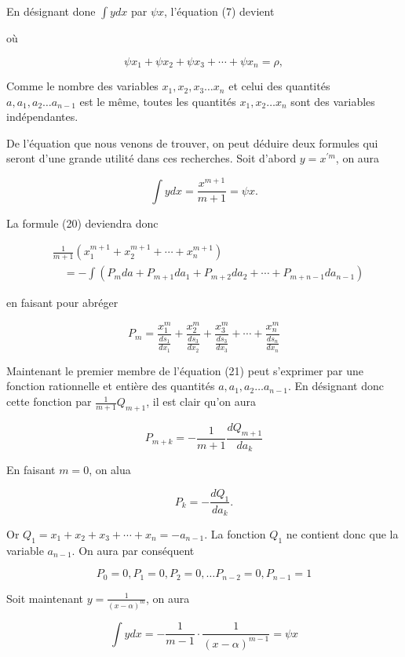 \documentclass{article}
\begin{document}
En désignant done \(\int y d x\) par \(\psi x\), l'équation (7) devient

où

\[
\psi x_{1}+\psi x_{2}+\psi x_{3}+\cdots+\psi x_{n}=\rho,
\]


Comme le nombre des variables \(x_{1}, x_{2}, x_{3} \ldots x_{n}\) et celui des quantités \(a, a_{1}, a_{2} \ldots a_{n-1}\) est le même, toutes les quantités \(x_{1}, x_{2} \ldots x_{n}\) sont des variables indépendantes.

De l'équation que nous venons de trouver, on peut déduire deux formules qui seront d'une grande utilité dans ces recherches. Soit d'abord \(y=x^{\prime m}\), on aura

\[
\int y d x=\frac{x^{m+1}}{m+1}=\psi x .
\]

La formule (20) deviendra donc

\[
\begin{aligned}
& \frac{1}{m+1}\left(x_{1}^{m+1}+x_{2}^{m+1}+\cdots+x_{n}^{m+1}\right) \\
& \quad=-\int\left(P_{m} d a+P_{m+1} d a_{1}+P_{m+2} d a_{2}+\cdots+P_{m+n-1} d a_{n-1}\right)
\end{aligned}
\]

en faisant pour abréger

\[
P_{m}=\frac{x_{1}^{m}}{\frac{d s_{1}}{d x_{1}}}+\frac{x_{2}^{m}}{\frac{d s_{3}}{d x_{2}}}+\frac{x_{3}^{m}}{\frac{d s_{3}}{d x_{3}}}+\cdots+\frac{x_{n}^{m}}{\frac{d s_{n}}{d x_{n}}}
\]

Maintenant le premier membre de l'équation (21) peut s'exprimer par une fonction rationnelle et entière des quantités \(a, a_{1}, a_{2} \ldots a_{n-1}\). En désignant donc cette fonction par \(\frac{1}{m+1} Q_{m+1}\), il est clair qu'on aura

\[
P_{m+k}=-\frac{1}{m+1} \frac{d Q_{m+1}}{d a_{k}}
\]

En faisant \(m=0\), on alua

\[
P_{k}=-\frac{d Q_{1}}{d a_{k}} .
\]

Or \(Q_{1}=x_{1}+x_{2}+x_{3}+\cdots+x_{n}=-a_{n-1}\). La fonction \(Q_{1}\) ne contient donc que la variable \(a_{n-1}\). On aura par conséquent

\[
P_{0}=0, P_{1}=0, P_{2}=0, \ldots P_{n-2}=0, P_{n-1}=1
\]

Soit maintenant \(y=\frac{1}{(x-\alpha)^{m}}\), on aura

\[
\int y d x=-\frac{1}{m-1} \cdot \frac{1}{(x-\alpha)^{m-1}}=\psi x
\]
\end{document}
